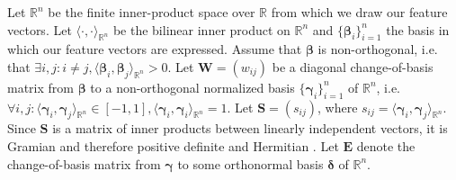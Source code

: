 \documentclass[
  digital, %
  notable, %
  lof,     %
  lot,     %
  nopalatino, color
]{fithesis3}
\begin{document}
Let $\mathbb R^n$ be the finite inner-product space over
$\mathbb R$ from which we draw our feature vectors. Let
$\langle\cdot,\cdot\rangle_{\mathbb R^n}$ be the bilinear inner product on
$\mathbb R^n$ and $\{\bm{\beta}_i\}_{i = 1}^n$
the basis in which our feature vectors are expressed. Assume that
$\bm{\beta}$ is non-orthogonal, i.e. that $\exists i,
j: i\not=j, \langle \bm{\beta}_i,
\bm{\beta}_j\rangle_{\mathbb R^n} > 0$. Let $\mathbf W=(w_{ij})$ be a diagonal change-of-basis matrix from $\bm\beta$ to a non-orthogonal
normalized basis $\{\bm{\gamma}_i\}_{i = 1}^n$ of
$\mathbb R^n$, i.e. $\forall i, j: \langle \bm{\gamma}_i,
\bm{\gamma}_j\rangle_{\mathbb R^n}\in[-1, 1], \langle \bm{\gamma}_i,
\bm{\gamma}_i\rangle_{\mathbb R^n}=1$.  Let $\mathbf S=(s_{ij})$, where $s_{ij} = \langle \bm{\gamma}_i, \bm{\gamma}_j\rangle_{\mathbb
R^n}$. Since $\mathbf S$ is a matrix of inner products between linearly
independent vectors, it is Gramian and therefore positive
definite and Hermitian%
. Let $\mathbf E$ denote the
change-of-basis matrix from $\bm\gamma$ to some orthonormal
basis $\bm\delta$ of $\mathbb R^n$.
\end{document}
